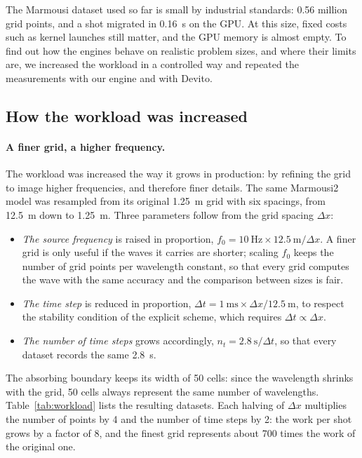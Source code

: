 \documentclass[letterpaper,11pt,leqno]{article}
\begin{document}
The Marmousi dataset used so far is small by industrial standards: 0.56 million
grid points, and a shot migrated in 0.16~s on the GPU. At this size, fixed costs
such as kernel launches still matter, and the GPU memory is almost empty. To
find out how the engines behave on realistic problem sizes, and where their
limits are, we increased the workload in a controlled way and repeated the
measurements with our engine and with Devito.

\subsection{How the workload was increased}

\paragraph{A finer grid, a higher frequency.}
The workload was increased the way it grows in production: by refining the
grid to image higher frequencies, and therefore finer details. The same
Marmousi2 model was resampled from its original 1.25~m grid with six spacings,
from 12.5~m down to 1.25~m. Three parameters follow from the grid spacing
$\Delta x$:
\begin{itemize}
\item \emph{The source frequency} is raised in proportion,
  $f_0 = 10~\text{Hz} \times 12.5~\text{m}/\Delta x$. A finer grid is only
  useful if the waves it carries are shorter; scaling $f_0$ keeps the number of
  grid points per wavelength constant, so that every grid computes the wave
  with the same accuracy and the comparison between sizes is fair.
\item \emph{The time step} is reduced in proportion,
  $\Delta t = 1~\text{ms} \times \Delta x/12.5~\text{m}$, to respect the
  stability condition of the explicit scheme, which requires
  $\Delta t \propto \Delta x$.
\item \emph{The number of time steps} grows accordingly, $n_t = 2.8~\text{s}/\Delta t$,
  so that every dataset records the same 2.8~s.
\end{itemize}
The absorbing boundary keeps its width of 50 cells: since the wavelength shrinks
with the grid, 50 cells always represent the same number of wavelengths.
Table~\ref{tab:workload} lists the resulting datasets. Each halving of $\Delta x$
multiplies the number of points by 4 and the number of time steps by 2: the work
per shot grows by a factor of 8, and the finest grid represents about 700 times
the work of the original one.
\end{document}
